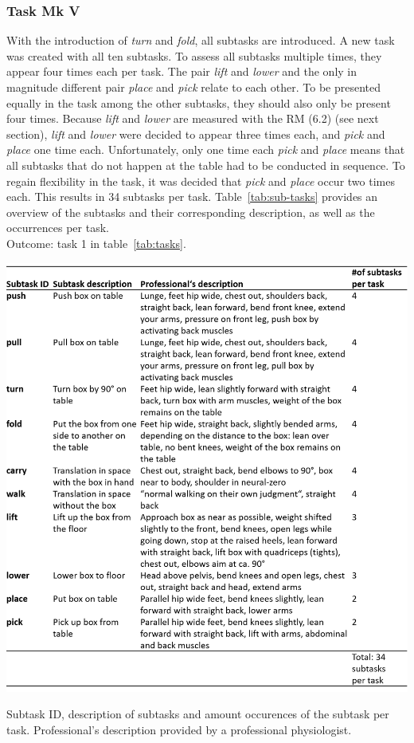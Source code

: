 \subsubsection{Task Mk V}
With the introduction of \textit{turn} and \textit{fold}, all subtasks are introduced. A new task was created with all ten subtasks. To assess all subtasks multiple times, they appear four times each per task. The pair \textit{lift} and \textit{lower} and the only in magnitude different pair \textit{place} and \textit{pick} relate to each other. To be presented equally in the task among the other subtasks, they should also only be present four times. Because \textit{lift} and \textit{lower} are measured with the RM (6.2) (see next section), \textit{lift} and \textit{lower} were decided to appear three times each, and \textit{pick} and \textit{place} one time each. Unfortunately, only one time each \textit{pick} and \textit{place} means that all subtasks that do not happen at the table had to be conducted in sequence. To regain flexibility in the task, it was decided that \textit{pick} and \textit{place} occur two times each. This results in 34 subtasks per task. Table~\ref{tab:sub-tasks} provides an overview of the subtasks and their corresponding description, as well as the occurrences per task.\\
Outcome: task 1 in table~\ref{tab:tasks}.

\begin{table}[H]
	\centering
	\includegraphics[width=\textwidth]{figures/sub_tasks_definition.png}
	\caption[Description of subtasks]{Subtask ID, description of subtasks and amount occurences of the subtask per task. Professional's description provided by a professional physiologist.}
	\label{tab:sub-tasks}
\end{table}

